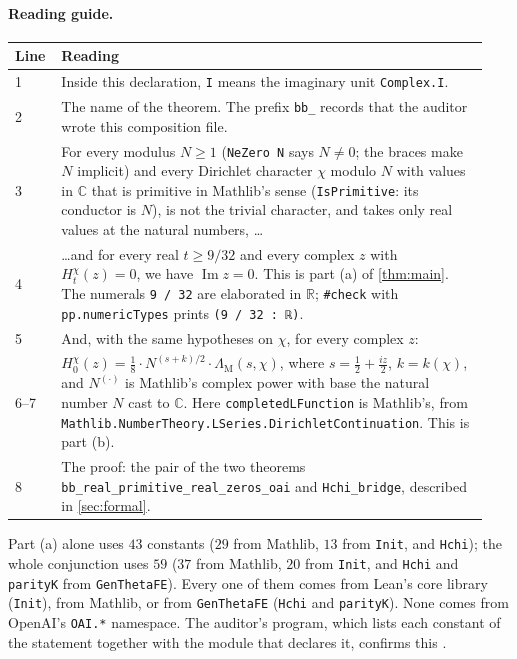 \documentclass[11pt]{article}
\theoremstyle{definition}
\newcommand{\lean}[1]{\texttt{#1}}
\newcommand{\im}{\operatorname{Im}}
\newcommand{\C}{\mathbb{C}}
\newcommand{\R}{\mathbb{R}}
\newcommand{\Lc}{\Lambda}
\begin{document}
\paragraph{Reading guide.}
\begin{center}\small
\begin{longtable}{@{}p{0.08\linewidth}p{0.86\linewidth}@{}}
\toprule
Line & Reading \\
\midrule
1 & Inside this declaration, \lean{I} means the imaginary unit \lean{Complex.I}. \\
2 & The name of the theorem. The prefix \lean{bb\_\allowbreak{}} records that the auditor wrote this composition file. \\
3 & For every modulus $N \ge 1$ (\lean{NeZero N} says $N \ne 0$; the braces make $N$ implicit) and every Dirichlet character $\chi$ modulo $N$ with values in $\C$ that is primitive in Mathlib's sense (\lean{IsPrimitive}: its conductor is $N$), is not the trivial character, and takes only real values at the natural numbers, \dots \\
4 & \dots and for every real $t \ge 9/32$ and every complex $z$ with $H^\chi_t(z) = 0$, we have $\im z = 0$. This is part (a) of \cref{thm:main}. The numerals \lean{9 /\allowbreak{} 32} are elaborated in $\R$; \lean{\#check} with \lean{pp.numericTypes} prints \lstinline[basicstyle=\ttfamily,backgroundcolor={}]|(9 / 32 : ℝ)|. \\
5 & And, with the same hypotheses on $\chi$, for every complex $z$: \\
6--7 & $H^\chi_0(z) = \tfrac18 \cdot N^{(s+k)/2}\cdot\Lc_{\mathrm{M}}(s,\chi)$, where $s = \tfrac12 + \tfrac{iz}{2}$, $k = k(\chi)$, and $N^{(\cdot)}$ is Mathlib's complex power with base the natural number $N$ cast to $\C$. Here \lean{completedLFunction} is Mathlib's, from \lean{Mathlib.NumberTheory.LSeries.DirichletContinuation}. This is part (b). \\
8 & The proof: the pair of the two theorems \lean{bb\_\allowbreak{}real\_\allowbreak{}primitive\_\allowbreak{}real\_\allowbreak{}zeros\_\allowbreak{}oai} and \lean{Hchi\_\allowbreak{}bridge}, described in \cref{sec:formal}. \\
\bottomrule
\end{longtable}
\end{center}

\noindent
Part (a) alone uses $43$ constants ($29$ from Mathlib, $13$ from \lean{Init}, and \lean{Hchi}); the whole conjunction uses $59$ ($37$ from Mathlib, $20$ from \lean{Init}, and \lean{Hchi} and \lean{parityK} from \lean{GenThetaFE}). Every one of them comes from Lean's core library (\lean{Init}), from Mathlib, or from \lean{GenThetaFE} (\lean{Hchi} and \lean{parityK}). None comes from OpenAI's \lean{OAI.*} namespace. The auditor's program, which lists each constant of the statement together with the module that declares it, confirms this \cite[REVIEW\_GAUSS\_SIGN\_AND\_OAI \S B.3; ADD1 \S3]{bbrecords}.
\end{document}
